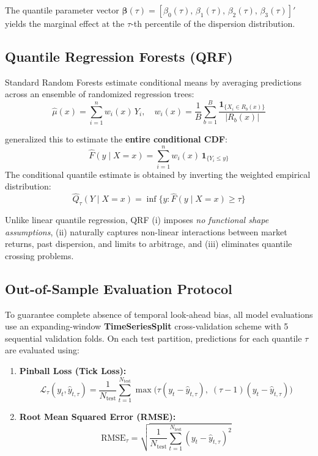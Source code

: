 \documentclass[12pt, a4paper]{article}
\begin{document}
The quantile parameter vector $\boldsymbol{\beta}(\tau) = [\beta_0(\tau),\, \beta_1(\tau),\, \beta_2(\tau),\, \beta_3(\tau)]'$ yields the marginal effect at the $\tau$-th percentile of the dispersion distribution.

\subsection{Quantile Regression Forests (QRF)}

Standard Random Forests \citep{Breiman2001} estimate conditional means by averaging predictions across an ensemble of randomized regression trees:
\begin{equation}
  \hat{\mu}(x) = \sum_{i=1}^n w_i(x)\, Y_i, \quad
  w_i(x) = \frac{1}{B} \sum_{b=1}^B \frac{\mathbf{1}_{\{X_i \in R_b(x)\}}}{|R_b(x)|}
\end{equation}

\citet{Meinshausen2006} generalized this to estimate the \textbf{entire conditional CDF}:
\begin{equation}
  \hat{F}(y \mid X=x) = \sum_{i=1}^n w_i(x)\, \mathbf{1}_{\{Y_i \le y\}}
\end{equation}
The conditional quantile estimate is obtained by inverting the weighted empirical distribution:
\begin{equation}
  \hat{Q}_\tau(Y \mid X=x) = \inf\bigl\{y : \hat{F}(y \mid X=x) \ge \tau\bigr\}
\end{equation}

Unlike linear quantile regression, QRF (i) imposes \emph{no functional shape assumptions}, (ii) naturally captures non-linear interactions between market returns, past dispersion, and limits to arbitrage, and (iii) eliminates quantile crossing problems.

\subsection{Out-of-Sample Evaluation Protocol}

To guarantee complete absence of temporal look-ahead bias, all model evaluations use an expanding-window \textbf{TimeSeriesSplit} cross-validation scheme with 5 sequential validation folds. On each test partition, predictions for each quantile $\tau$ are evaluated using:

\begin{enumerate}[label=\arabic*.]
  \item \textbf{Pinball Loss (Tick Loss):}
    \begin{equation}
      \mathcal{L}_\tau(y_t, \hat{y}_{t,\tau})
      = \frac{1}{N_{\text{test}}} \sum_{t=1}^{N_{\text{test}}}
        \max\!\bigl(\tau(y_t - \hat{y}_{t,\tau}),\;(\tau-1)(y_t - \hat{y}_{t,\tau})\bigr)
    \end{equation}
  \item \textbf{Root Mean Squared Error (RMSE):}
    \begin{equation}
      \mathrm{RMSE}_\tau
      = \sqrt{\frac{1}{N_{\text{test}}} \sum_{t=1}^{N_{\text{test}}} (y_t - \hat{y}_{t,\tau})^2}
    \end{equation}
\end{enumerate}
\end{document}
